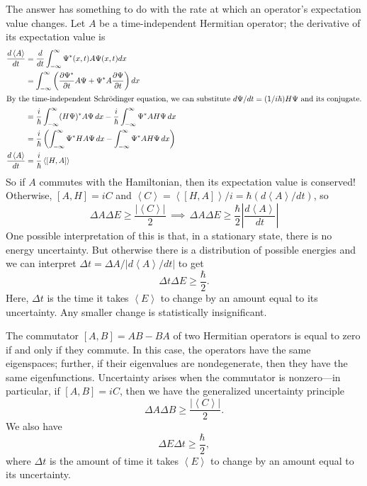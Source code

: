 \documentclass[../p052main.tex]{subfiles}
\begin{document}
The answer has something to do with the rate at which an operator's expectation value changes.
Let $A$ be a time-independent Hermitian operator; the derivative of its expectation value is
\begin{align*}
    \frac{d \left< A \right>}{dt} &= \frac{d}{dt} \int_{-\infty}^{\infty} \Psi^*(x,t) A \Psi (x,t) dx \\
    &= \int_{-\infty}^{\infty} \left( \frac{\partial \Psi^*}{\partial t} A \Psi + \Psi^* A \frac{\partial \Psi}{\partial t} \right) dx \\
    \intertext{By the time-independent Schrödinger equation, we can substitute $d\Psi / dt = (1 / i\hbar) H \Psi$ and its conjugate.}
    &= \frac{i}{\hbar} \int_{-\infty}^{\infty} (H \Psi)^* A \Psi \,dx - \frac{i}{\hbar} \int_{-\infty}^{\infty} \Psi^* A H \Psi \,dx \\
    &= \frac{i}{\hbar} \left( \int_{-\infty}^{\infty} \Psi^* H A \Psi \,dx - \int_{-\infty}^{\infty} \Psi^* A H \Psi \,dx \right) \\
    \frac{d \left< A \right>}{dt} &= \frac{i}{\hbar} \left< [H, A] \right>
\end{align*}
So if $A$ commutes with the Hamiltonian, then its expectation value is conserved!
Otherwise, $[A, H] = iC$ and $\left< C \right> = \left< [H, A] \right> / i = \hbar (d \left< A \right> / dt)$, so
\[ \Delta A \Delta E \geq \frac{|\left< C \right>|}{2} \,\implies\, \Delta A \Delta E \geq \frac{\hbar}{2} \left| \frac{d \left< A \right>}{dt} \right| \]
One possible interpretation of this is that, in a stationary state, there is no energy uncertainty.
But otherwise there is a distribution of possible energies and we can interpret
$\Delta t = \Delta A / |d \left< A \right> / dt|$ to get
\[ \Delta t \Delta E \geq \frac{\hbar}{2}. \]
Here, $\Delta t$ is the time it takes $\left< E \right>$ to change by an amount equal to its uncertainty.
Any smaller change is statistically insignificant.

\begin{summary}
    The commutator $[A,B] = AB - BA$ of two Hermitian operators is equal to zero if and only if they commute.
    In this case, the operators have the same eigenspaces; further, if their eigenvalues are nondegenerate, then they have the same eigenfunctions.
    Uncertainty arises when the commutator is nonzero---in particular, if $[A,B] = iC$, then we have the generalized uncertainty principle
    \[ \Delta A \Delta B \geq \frac{|\left< C \right>|}{2}. \]
    We also have
    \[ \Delta E \Delta t \geq \frac{\hbar}{2}, \]
    where $\Delta t$ is the amount of time it takes $\left< E \right>$ to change by an amount equal to its uncertainty.
\end{summary}
\end{document}
